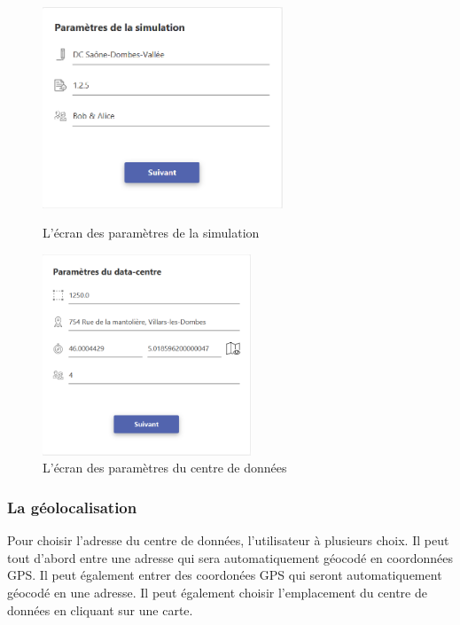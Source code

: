 \begin{figure}[h!]
	\begin{minipage}{0.48\textwidth}
		\centering
		\includegraphics[height=6cm]{partie3/images/simulation.png}
		\caption{L'écran des paramètres de la simulation}
	\end{minipage}\hfill
	\begin{minipage}{0.48\textwidth}
		\centering
		\includegraphics[height=6cm]{partie3/images/datacenter.png}
		\caption{L'écran des paramètres du centre de données}
	\end{minipage}\hfill
\end{figure}

\subsubsection{La géolocalisation}
Pour choisir l'adresse du centre de données, l'utilisateur à plusieurs choix. Il peut tout d'abord entre une adresse qui sera automatiquement géocodé en coordonnées GPS. Il peut également entrer des coordonées GPS qui seront automatiquement géocodé en une adresse. Il peut également choisir l'emplacement du centre de données en cliquant sur une carte.

